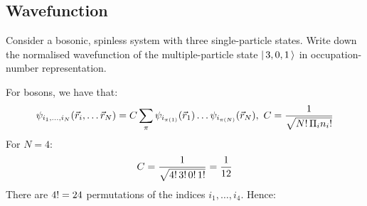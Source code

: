 \subsection{Wavefunction}

Consider a bosonic, spinless system with three single-particle states.
Write down the normalised wavefunction of the multiple-particle state $\lvert\,3,
    0, 1\,\rangle$ in occupation-number representation.

For bosons, we have that:
\begin{equation}
  \psi_{i_1, \dots, i_N}(\vec{r}_i, \dots \vec{r}_N) = C \sum_\pi \psi_{i_{\pi(1)}} (\vec{r}_1) \dots \psi_{i_{\pi(N)}} (\vec{r}_N)
  ,\
  C = \frac{1}{\sqrt{N {!} \, \Pi_i n_i {!} \mathstrut}}
\end{equation}
For $N = 4$:
\begin{equation*}
  C = \frac{1}{\sqrt{4 {!} \, 3 {!} \, 0 {!} \, 1 {!} \mathstrut}} =
  \frac{1}{12}
\end{equation*}
There are $4 {!} = 24$ permutations of the
indices $i_1, \dots, i_4$.
Hence:
